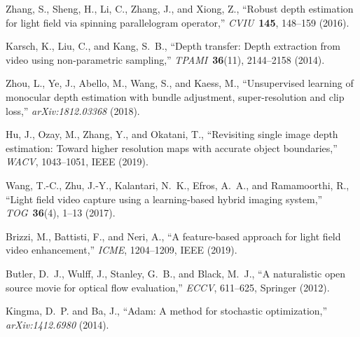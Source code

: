 \documentclass[]{spie}
\begin{document}
\begin{thebibliography}{10}
Zhang, S., Sheng, H., Li, C., Zhang, J., and Xiong, Z., ``Robust depth
  estimation for light field via spinning parallelogram operator,'' {\em
  CVIU}~{\bf 145},  148--159 (2016).

Karsch, K., Liu, C., and Kang, S.~B., ``Depth transfer: Depth extraction from
  video using non-parametric sampling,'' {\em TPAMI}~{\bf 36}(11),  2144--2158 (2014).

Zhou, L., Ye, J., Abello, M., Wang, S., and Kaess, M., ``Unsupervised learning
  of monocular depth estimation with bundle adjustment, super-resolution and
  clip loss,'' {\em arXiv:1812.03368}  (2018).

Hu, J., Ozay, M., Zhang, Y., and Okatani, T., ``Revisiting single image depth
  estimation: Toward higher resolution maps with accurate object boundaries,''
  {\em WACV}{\nolinebreak\hspace{0.1em}},   1043--1051, IEEE (2019).

Wang, T.-C., Zhu, J.-Y., Kalantari, N.~K., Efros, A.~A., and Ramamoorthi, R.,
  ``Light field video capture using a learning-based hybrid imaging system,''
  {\em TOG}~{\bf 36}(4),  1--13 (2017).

Brizzi, M., Battisti, F., and Neri, A., ``A feature-based approach for light
  field video enhancement,'' {\em ICME}{\nolinebreak\hspace{0.1em}},   1204--1209, IEEE
  (2019).

Butler, D.~J., Wulff, J., Stanley, G.~B., and Black, M.~J., ``A naturalistic
  open source movie for optical flow evaluation,'' {\em ECCV}{\nolinebreak\hspace{0.1em}},   611--625, Springer
  (2012).

Kingma, D.~P. and Ba, J., ``Adam: A method for stochastic optimization,'' 
  {\em arXiv:1412.6980}  (2014).

\end{thebibliography}
  
\end{document}
